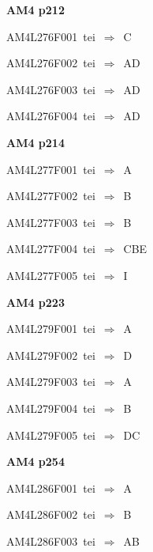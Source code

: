 \par\vfill\eject
{\bf\hfill AM4 p212\hfill\hbox{}}\par\bigskip
{\sixrm AM4L276F001\ {\sixit tei}\ }$\Rightarrow$\ C\par\smallskip
{\sixrm AM4L276F002\ {\sixit tei}\ }$\Rightarrow$\ AD\par\smallskip
{\sixrm AM4L276F003\ {\sixit tei}\ }$\Rightarrow$\ AD\par\smallskip
{\sixrm AM4L276F004\ {\sixit tei}\ }$\Rightarrow$\ AD\par\smallskip

\par\vfill\eject
{\bf\hfill AM4 p214\hfill\hbox{}}\par\bigskip
{\sixrm AM4L277F001\ {\sixit tei}\ }$\Rightarrow$\ A\par\smallskip
{\sixrm AM4L277F002\ {\sixit tei}\ }$\Rightarrow$\ B\par\smallskip
{\sixrm AM4L277F003\ {\sixit tei}\ }$\Rightarrow$\ B\par\smallskip
{\sixrm AM4L277F004\ {\sixit tei}\ }$\Rightarrow$\ CBE\par\smallskip
{\sixrm AM4L277F005\ {\sixit tei}\ }$\Rightarrow$\ I\par\smallskip

\par\vfill\eject
{\bf\hfill AM4 p223\hfill\hbox{}}\par\bigskip
{\sixrm AM4L279F001\ {\sixit tei}\ }$\Rightarrow$\ A\par\smallskip
{\sixrm AM4L279F002\ {\sixit tei}\ }$\Rightarrow$\ D\par\smallskip
{\sixrm AM4L279F003\ {\sixit tei}\ }$\Rightarrow$\ A\par\smallskip
{\sixrm AM4L279F004\ {\sixit tei}\ }$\Rightarrow$\ B\par\smallskip
{\sixrm AM4L279F005\ {\sixit tei}\ }$\Rightarrow$\ DC\par\smallskip

\par\vfill\eject
{\bf\hfill AM4 p254\hfill\hbox{}}\par\bigskip
{\sixrm AM4L286F001\ {\sixit tei}\ }$\Rightarrow$\ A\par\smallskip
{\sixrm AM4L286F002\ {\sixit tei}\ }$\Rightarrow$\ B\par\smallskip
{\sixrm AM4L286F003\ {\sixit tei}\ }$\Rightarrow$\ AB\par\smallskip

